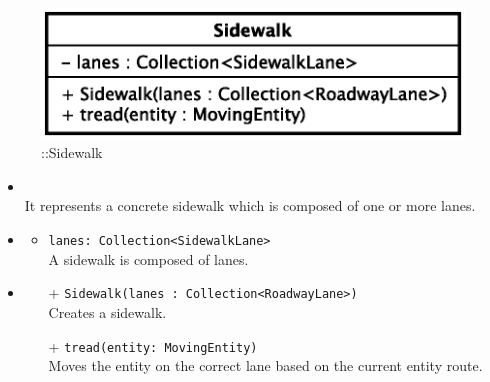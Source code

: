 \begin{figure}[h]
\centering
\includegraphics[scale=0.6,keepaspectratio]{images/solution/sidewalk.eps}
\caption{\pReactiveComponent::Sidewalk}
\label{fig:sd-app-sidewalk}
\end{figure}
\FloatBarrier
\begin{itemize}
  \item \textbf{\descr} \\
    It represents a concrete sidewalk which is composed of one or more lanes.
  \item \textbf{\attrs}
  \begin{itemize}
    \item \texttt{lanes: Collection<SidewalkLane>} \\
A sidewalk is composed of lanes.
  \end{itemize}
  \item \textbf{\ops}
  \begin{itemize}
  \item[+] \texttt{Sidewalk(lanes : Collection<RoadwayLane>)} \\
    Creates a sidewalk.
    \item[+] \texttt{tread(entity: MovingEntity)} \\
Moves the entity on the correct lane based on the current entity route. 
  \end{itemize}
\end{itemize}
